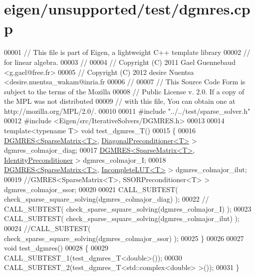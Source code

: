 \hypertarget{eigen_2unsupported_2test_2dgmres_8cpp_source}{}\section{eigen/unsupported/test/dgmres.cpp}
\label{eigen_2unsupported_2test_2dgmres_8cpp_source}

\begin{DoxyCode}
00001 \textcolor{comment}{// This file is part of Eigen, a lightweight C++ template library}
00002 \textcolor{comment}{// for linear algebra.}
00003 \textcolor{comment}{//}
00004 \textcolor{comment}{// Copyright (C) 2011 Gael Guennebaud <g.gael@free.fr>}
00005 \textcolor{comment}{// Copyright (C) 2012 desire Nuentsa <desire.nuentsa\_wakam@inria.fr}
00006 \textcolor{comment}{//}
00007 \textcolor{comment}{// This Source Code Form is subject to the terms of the Mozilla}
00008 \textcolor{comment}{// Public License v. 2.0. If a copy of the MPL was not distributed}
00009 \textcolor{comment}{// with this file, You can obtain one at http://mozilla.org/MPL/2.0/.}
00010 
00011 \textcolor{preprocessor}{#include "../../test/sparse\_solver.h"}
00012 \textcolor{preprocessor}{#include <Eigen/src/IterativeSolvers/DGMRES.h>}
00013 
00014 \textcolor{keyword}{template}<\textcolor{keyword}{typename} T> \textcolor{keywordtype}{void} test\_dgmres\_T()
00015 \{
00016   \hyperlink{class_eigen_1_1_d_g_m_r_e_s}{DGMRES<SparseMatrix<T>}, \hyperlink{group___iterative_linear_solvers___module_class_eigen_1_1_diagonal_preconditioner}{DiagonalPreconditioner<T>} > 
      dgmres\_colmajor\_diag;
00017   \hyperlink{class_eigen_1_1_d_g_m_r_e_s}{DGMRES<SparseMatrix<T>}, \hyperlink{group___iterative_linear_solvers___module_class_eigen_1_1_identity_preconditioner}{IdentityPreconditioner}    > 
      dgmres\_colmajor\_I;
00018   \hyperlink{class_eigen_1_1_d_g_m_r_e_s}{DGMRES<SparseMatrix<T>}, \hyperlink{group___iterative_linear_solvers___module_class_eigen_1_1_incomplete_l_u_t}{IncompleteLUT<T>} >           
      dgmres\_colmajor\_ilut;
00019   \textcolor{comment}{//GMRES<SparseMatrix<T>, SSORPreconditioner<T> >     dgmres\_colmajor\_ssor;}
00020 
00021   CALL\_SUBTEST( check\_sparse\_square\_solving(dgmres\_colmajor\_diag)  );
00022 \textcolor{comment}{//   CALL\_SUBTEST( check\_sparse\_square\_solving(dgmres\_colmajor\_I)     );}
00023   CALL\_SUBTEST( check\_sparse\_square\_solving(dgmres\_colmajor\_ilut)     );
00024   \textcolor{comment}{//CALL\_SUBTEST( check\_sparse\_square\_solving(dgmres\_colmajor\_ssor)     );}
00025 \}
00026 
00027 \textcolor{keywordtype}{void} test\_dgmres()
00028 \{
00029   CALL\_SUBTEST\_1(test\_dgmres\_T<double>());
00030   CALL\_SUBTEST\_2(test\_dgmres\_T<std::complex<double> >());
00031 \}
\end{DoxyCode}
